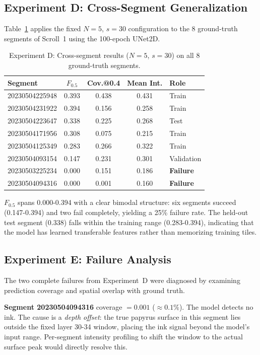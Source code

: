 \subsection{Experiment D: Cross-Segment Generalization}

Table~\ref{tab:exp_d} applies the fixed $N = 5$, $s = 30$ configuration to the 8 ground-truth segments of Scroll~1 using the 100-epoch UNet2D.

\begin{table}[h]
\centering
\caption{Experiment D: Cross-segment results ($N = 5$, $s = 30$) on all 8 ground-truth segments.}
\label{tab:exp_d}
\begin{tabular}{lcccl}
\hline
\textbf{Segment} & \textbf{$F_{0.5}$} & \textbf{Cov.@0.4} & \textbf{Mean Int.} & \textbf{Role} \\
\hline
20230504225948 & 0.393 & 0.438 & 0.431 & Train \\
20230504231922 & 0.394 & 0.156 & 0.258 & Train \\
20230504223647 & 0.338 & 0.225 & 0.268 & Test \\
20230504171956 & 0.308 & 0.075 & 0.215 & Train \\
20230504125349 & 0.283 & 0.266 & 0.322 & Train \\
20230504093154 & 0.147 & 0.231 & 0.301 & Validation \\
20230503225234 & 0.000 & 0.151 & 0.186 & \textbf{Failure} \\
20230504094316 & 0.000 & 0.001 & 0.160 & \textbf{Failure} \\
\hline
\end{tabular}
\end{table}

$F_{0.5}$ spans 0.000-0.394 with a clear bimodal structure: six segments succeed (0.147-0.394) and two fail completely, yielding a 25\% failure rate. The held-out test segment (0.338) falls within the training range (0.283-0.394), indicating that the model has learned transferable features rather than memorizing training tiles.

\subsection{Experiment E: Failure Analysis}

The two complete failures from Experiment~D were diagnosed by examining prediction coverage and spatial overlap with ground truth.

\textbf{Segment 20230504094316} coverage $= 0.001$ ($\approx 0.1\%$). The model detects no ink. The cause is a \emph{depth offset}: the true papyrus surface in this segment lies outside the fixed layer 30-34 window, placing the ink signal beyond the model's input range. Per-segment intensity profiling to shift the window to the actual surface peak would directly resolve this.

